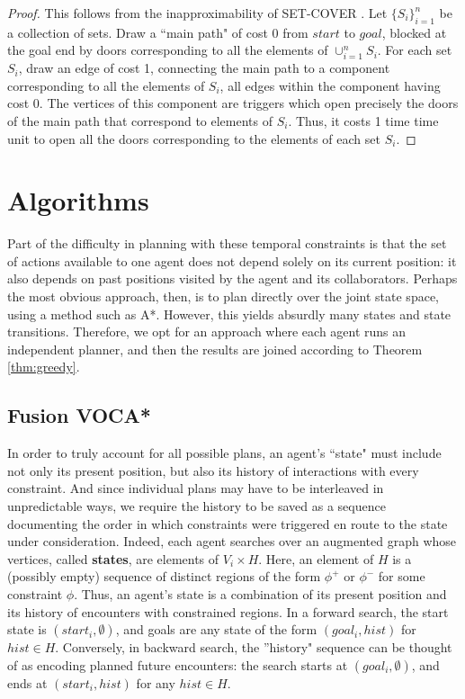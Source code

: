 \documentclass[letterpaper]{article}
\begin{document}
\begin{proof}
This follows from the inapproximability of SET-COVER \cite{moshkovitz2012projection}. Let $\{S_i\}_{i=1}^n$ be a collection of sets. Draw a ``main path" of cost 0 from $start$ to $goal$, blocked at the goal end by doors corresponding to all the elements of $\cup_{i=1}^n S_i$. For each set $S_i$, draw an edge of cost 1, connecting the main path to a component corresponding to all the elements of $S_i$, all edges within the component having cost 0. The vertices of this component are triggers which open precisely the doors of the main path that correspond to elements of $S_i$. Thus, it costs 1 time time unit to open all the doors corresponding to the elements of each set $S_i$.
\end{proof}

\section{Algorithms}

Part of the difficulty in planning with these temporal constraints is that the set of actions available to one agent does not depend solely on its current position: it also depends on past positions visited by the agent and its collaborators. Perhaps the most obvious approach, then, is to plan directly over the joint state space, using a method such as A*. However, this yields absurdly many states and state transitions. Therefore, we opt for an approach where each agent runs an independent planner, and then the results are joined according to Theorem \ref{thm:greedy}.

\subsection{Fusion VOCA*}

In order to truly account for all possible plans, an agent's ``state" must include not only its present position, but also its history of interactions with every constraint. And since individual plans may have to be interleaved in unpredictable ways, we require the history to be saved as a sequence documenting the order in which constraints were triggered en route to the state under consideration. Indeed, each agent searches over an augmented graph whose vertices, called \textbf{states}, are elements of $V_i \times H$. Here, an element of $H$ is a (possibly empty) sequence of distinct regions of the form $\phi^+$ or $\phi^-$ for some constraint $\phi$. Thus, an agent's state is a combination of its present position and its history of encounters with constrained regions. In a forward search, the start state is $(start_i, \emptyset)$, and goals are any state of the form $(goal_i, hist)$ for $hist\in H$. Conversely, in backward search, the ''history" sequence can be thought of as encoding planned future encounters: the search starts at $(goal_i, \emptyset)$, and ends at $(start_i, hist)$ for any $hist\in H$.
\end{document}
